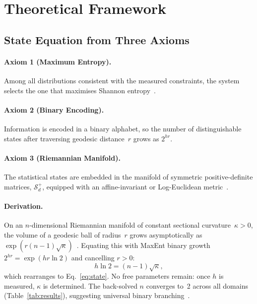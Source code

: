 \documentclass[letterpaper]{article}
\begin{document}
\section{Theoretical Framework}\label{sec:theory}

\subsection{State Equation from Three Axioms}

\paragraph{Axiom 1 (Maximum Entropy).}
Among all distributions consistent with the measured
constraints, the system selects the one that maximises
Shannon entropy~\citep{shannon1948}.

\paragraph{Axiom 2 (Binary Encoding).}
Information is encoded in a binary alphabet, so the number
of distinguishable states after traversing geodesic
distance~$r$ grows as $2^{hr}$.

\paragraph{Axiom 3 (Riemannian Manifold).}
The statistical states are embedded in the manifold of
symmetric positive-definite matrices,
$\mathcal{S}^+_d$, equipped with an affine-invariant or
Log-Euclidean metric~\citep{arsigny2007, pennec2006}.

\paragraph{Derivation.}
On an $n$-dimensional Riemannian manifold of constant
sectional curvature~$\kappa>0$, the volume of a geodesic
ball of radius~$r$ grows asymptotically as
$\exp(r(n{-}1)\sqrt{\kappa})$~\citep{gromov1987}.
Equating this with MaxEnt binary growth
$2^{hr}=\exp(hr\ln 2)$ and cancelling $r>0$:
\begin{equation}\label{eq:derive}
  h\ln 2 = (n{-}1)\sqrt{\kappa},
\end{equation}
which rearranges to Eq.~\eqref{eq:state}.
No free parameters remain: once $h$ is measured,
$\kappa$ is determined.
The back-solved $n$ converges to~2 across all
domains (Table~\ref{tab:results}), suggesting universal
binary branching~\citep{fenn2025theory}.
\end{document}
